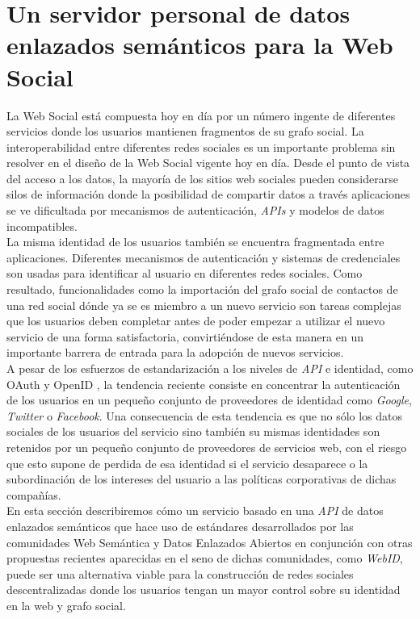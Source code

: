 \section{Un servidor personal de datos enlazados sem\'anticos para la Web Social}

La Web Social est\'a compuesta hoy en d\'ia por un n\'umero ingente de diferentes servicios donde los usuarios mantienen fragmentos de su grafo social. La interoperabilidad entre diferentes redes sociales es un importante problema sin resolver en el dise\~no de la Web Social vigente hoy en d\'ia. Desde el punto de vista del acceso a los datos, la mayor\'ia de los sitios web sociales pueden considerarse silos de informaci\'on \cite{halpin2008beyond} donde la posibilidad de compartir datos a trav\'es aplicaciones se ve dificultada por mecanismos de autenticaci\'on, \textit{APIs}  y modelos de datos incompatibles.\\
La misma identidad de los usuarios tambi\'en se encuentra fragmentada entre aplicaciones. Diferentes mecanismos de autenticaci\'on y sistemas de credenciales son usadas para identificar al usuario en diferentes redes sociales. Como resultado, funcionalidades como la importaci\'on del grafo social de contactos de una red social d\'onde ya se es miembro a un nuevo servicio son tareas complejas que los usuarios deben completar antes de poder empezar a utilizar el nuevo servicio de una forma satisfactoria, convirti\'endose de esta manera en un importante barrera de entrada para la adopci\'on de nuevos servicios.\\
A pesar de los esfuerzos de estandarizaci\'on a los niveles de \textit{API} e identidad, como OAuth \cite{hammer2010oauth} y OpenID \cite{openid}, la tendencia reciente consiste en concentrar la autenticaci\'on de los usuarios en un peque\~no conjunto de proveedores de identidad como \textit{Google}, \textit{Twitter} o \textit{Facebook}. Una consecuencia de esta tendencia es que no s\'olo los datos sociales de los usuarios del servicio sino tambi\'en su mismas identidades son retenidos por un peque\~no conjunto de proveedores de servicios web, con el riesgo que esto supone de perdida de esa identidad si el servicio desaparece o la subordinaci\'on de los intereses del usuario a las pol\'iticas corporativas de dichas compa\~n\'ias.\\
En esta secci\'on describiremos c\'omo un servicio basado en una \textit{API} de datos enlazados sem\'anticos que hace uso de est\'andares desarrollados por las comunidades Web Sem\'antica y Datos Enlazados Abiertos en conjunci\'on con otras propuestas recientes aparecidas en el seno de dichas comunidades, como \textit{WebID}, puede ser una alternativa viable para la construcci\'on de redes sociales descentralizadas donde los usuarios tengan un mayor control sobre su identidad en la web y grafo social.\\
